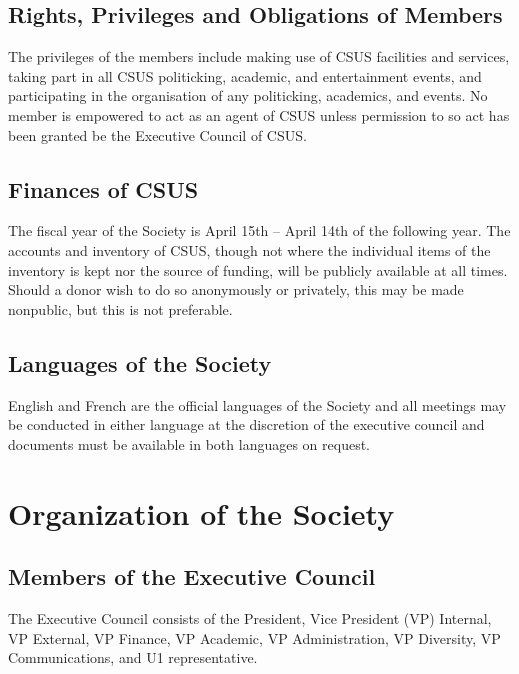 \subsection{Rights, Privileges and Obligations of
Members}\label{rights-privileges-and-obligations-of-members}

The privileges of the members include making use of CSUS facilities and
services, taking part in all CSUS politicking, academic, and
entertainment events, and participating in the organisation of any
politicking, academics, and events. No member is empowered to act as an
agent of CSUS unless permission to so act has been granted be the
Executive Council of CSUS.

\subsection{Finances of CSUS}\label{finances-of-csus}

The fiscal year of the Society is April 15th -- April 14th of the
following year. The accounts and inventory of CSUS, though not where the
individual items of the inventory is kept nor the source of funding,
will be publicly available at all times. Should a donor wish to do so
anonymously or privately, this may be made nonpublic, but this is not
preferable.

\subsection{Languages of the Society}\label{languages-of-the-society}

English and French are the official languages of the Society and all
meetings may be conducted in either language at the discretion of the
executive council and documents must be available in both languages on
request.

\section{Organization of the Society}\label{organization-of-the-society}

\subsection{Members of the Executive
Council}\label{members-of-the-executive-council}

The Executive Council consists of the President, Vice President (VP)
Internal, VP External, VP Finance, VP Academic, VP Administration, VP
Diversity, VP Communications, and U1 representative.

